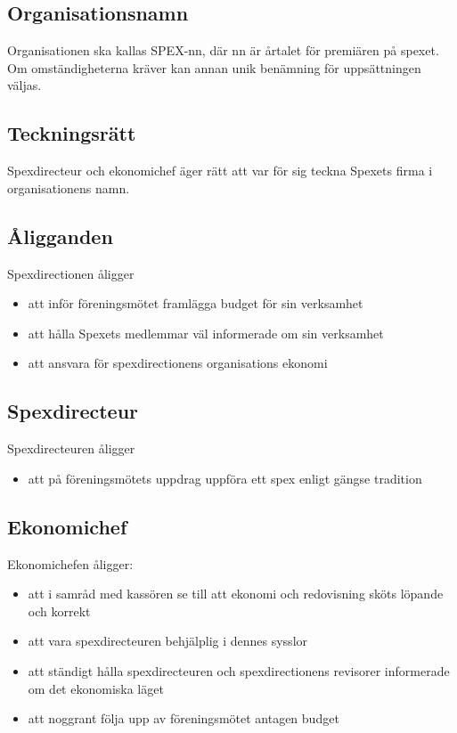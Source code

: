 \documentclass[a4paper]{article}
\begin{document}
\subsection{Organisationsnamn}
Organisationen ska kallas SPEX-nn, där nn är årtalet för premiären på spexet. Om omständigheterna kräver kan annan unik benämning för uppsättningen väljas.

\subsection{Teckningsrätt}
Spexdirecteur och ekonomichef äger rätt att var för sig teckna Spexets firma i organisationens namn.

\subsection{Åligganden}
Spexdirectionen åligger

\begin{itemize}
  \item att inför föreningsmötet framlägga budget för sin verksamhet
  \item att hålla Spexets medlemmar väl informerade om sin verksamhet
  \item att ansvara för spexdirectionens organisations ekonomi
\end{itemize}

\subsection{Spexdirecteur}
Spexdirecteuren åligger

\begin{itemize}
  \item att på föreningsmötets uppdrag uppföra ett spex enligt gängse tradition
\end{itemize}

\subsection{Ekonomichef}
Ekonomichefen åligger:

\begin{itemize}
  \item att i samråd med kassören se till att ekonomi och redovisning sköts löpande och korrekt
  \item att vara spexdirecteuren behjälplig i dennes sysslor
  \item att ständigt hålla spexdirecteuren och spexdirectionens revisorer informerade om det ekonomiska läget
  \item att noggrant följa upp av föreningsmötet antagen budget
\end{itemize}
\end{document}
